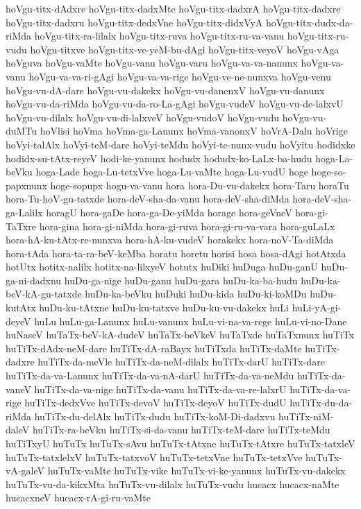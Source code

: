 {hoVgu-titx-dAdxre
hoVgu-titx-dadxMte
hoVgu-titx-dadxrA
hoVgu-titx-dadxre
hoVgu-titx-dadxru
hoVgu-titx-dedxVne
hoVgu-titx-didxVyA
hoVgu-titx-dudx-da-riMda
hoVgu-titx-ra-lilalx
hoVgu-titx-ruva
hoVgu-titx-ru-va-vanu
hoVgu-titx-ru-vudu
hoVgu-titxve
hoVgu-titx-ve-yeM-bu-dAgi
hoVgu-titx-veyoV
hoVgu-vAga
hoVguva
hoVgu-vaMte
hoVgu-vanu
hoVgu-varu
hoVgu-va-va-nanunx
hoVgu-va-vanu
hoVgu-va-va-ri-gAgi
hoVgu-va-va-rige
hoVgu-ve-ne-nunxva
hoVgu-venu
hoVgu-vu-dA-dare
hoVgu-vu-dakekx
hoVgu-vu-danenxV
hoVgu-vu-danunx
hoVgu-vu-da-riMda
hoVgu-vu-da-ro-La-gAgi
hoVgu-vudeV
hoVgu-vu-de-lalxvU
hoVgu-vu-dilalx
hoVgu-vu-di-lalxveV
hoVgu-vudoV
hoVgu-vudu
hoVgu-vu-duMTu
hoVlisi
hoVma
hoVma-ga-Lanunx
hoVma-vanonxV
hoVrA-Dalu
hoVrige
hoVyi-talAlx
hoVyi-teM-dare
hoVyi-teMdu
hoVyi-te-nunx-vudu
hoVyitu
hodidxke
hodidx-su-tAtx-reyeV
hodi-ke-yanunx
hodudx
hodudx-ko-LaLx-ba-hudu
hoga-La-beVku
hoga-Lade
hoga-Lu-tetxVve
hoga-Lu-vaMte
hoga-Lu-vudU
hoge
hoge-so-papxnunx
hoge-sopupx
hogu-va-vanu
hora
hora-Du-vu-dakekx
hora-Taru
horaTu
hora-Tu-hoV-gu-tatxde
hora-deV-sha-da-vanu
hora-deV-sha-diMda
hora-deV-sha-ga-Lalilx
horagU
hora-gaDe
hora-ga-De-yiMda
horage
hora-geVneV
hora-gi-TaTxre
hora-gina
hora-gi-niMda
hora-gi-ruva
hora-gi-ru-va-vara
hora-guLaLx
hora-hA-ku-tAtx-re-nunxva
hora-hA-ku-vudeV
horakekx
hora-noV-Ta-diMda
hora-tAda
hora-ta-ra-beV-keMba
horatu
horetu
horisi
hosa
hosa-dAgi
hotAtxda
hotUtx
hotitx-nalilx
hotitx-na-lilxyeV
hotutx
huDiki
huDuga
huDu-ganU
huDu-ga-ni-dadxnu
huDu-ga-nige
huDu-ganu
huDu-gara
huDu-ka-ba-hudu
huDu-ka-beV-kA-gu-tatxde
huDu-ka-beVku
huDuki
huDu-kida
huDu-ki-koMDu
huDu-kutAtx
huDu-ku-tAtxne
huDu-ku-tatxve
huDu-ku-vu-dakekx
huLi
huLi-yA-gi-deyeV
huLu
huLu-ga-Lanunx
huLu-vanunx
huLu-vi-na-va-rege
huLu-vi-no-Dane
huNaseV
huTaTx-beV-kA-dudeV
huTaTx-beVkeV
huTaTxde
huTaTxnunx
huTiTx
huTiTx-dAdx-neM-dare
huTiTx-dA-raBayx
huTiTxda
huTiTx-daMte
huTiTx-dadxre
huTiTx-da-meVle
huTiTx-da-neM-dilalx
huTiTx-darU
huTiTx-dare
huTiTx-da-va-Lanunx
huTiTx-da-va-nA-darU
huTiTx-da-va-neMdu
huTiTx-da-vaneV
huTiTx-da-va-nige
huTiTx-da-vanu
huTiTx-da-va-re-lalxrU
huTiTx-da-va-rige
huTiTx-dedxVve
huTiTx-devoV
huTiTx-deyoV
huTiTx-dudU
huTiTx-du-da-riMda
huTiTx-du-delAlx
huTiTx-dudu
huTiTx-koM-Di-dadxvu
huTiTx-niM-daleV
huTiTx-ra-beVku
huTiTx-si-da-vanu
huTiTx-teM-dare
huTiTx-teMdu
huTiTxyU
huTuTx
huTuTx-sAvu
huTuTx-tAtxne
huTuTx-tAtxre
huTuTx-tatxleV
huTuTx-tatxlelxV
huTuTx-tatxvoV
huTuTx-tetxVne
huTuTx-tetxVve
huTuTx-vA-galeV
huTuTx-vaMte
huTuTx-vike
huTuTx-vi-ke-yanunx
huTuTx-vu-dakekx
huTuTx-vu-da-kikxMta
huTuTx-vu-dilalx
huTuTx-vudu
hucacx
hucacx-naMte
hucacxneV
hucacx-rA-gi-ru-vaMte
}
